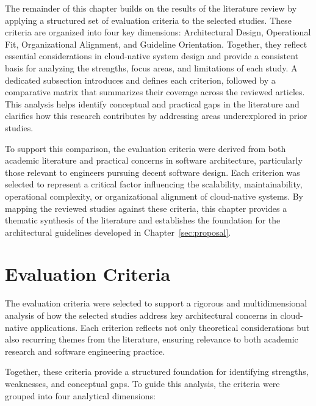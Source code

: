 The remainder of this chapter builds on the results of the literature review by applying a structured set of evaluation criteria to the selected studies. These criteria are organized into four key dimensions: Architectural Design, Operational Fit, Organizational Alignment, and Guideline Orientation. Together, they reflect essential considerations in cloud-native system design and provide a consistent basis for analyzing the strengths, focus areas, and limitations of each study. A dedicated subsection introduces and defines each criterion, followed by a comparative matrix that summarizes their coverage across the reviewed articles. This analysis helps identify conceptual and practical gaps in the literature and clarifies how this research contributes by addressing areas underexplored in prior studies.

To support this comparison, the evaluation criteria were derived from both academic literature and practical concerns in software architecture, particularly those relevant to engineers pursuing decent software design. Each criterion was selected to represent a critical factor influencing the scalability, maintainability, operational complexity, or organizational alignment of cloud-native systems. By mapping the reviewed studies against these criteria, this chapter provides a thematic synthesis of the literature and establishes the foundation for the architectural guidelines developed in Chapter~\ref{sec:proposal}.

\section{Evaluation Criteria}
\label{sec:evaluationcriteria}

The evaluation criteria were selected to support a rigorous and multidimensional analysis of how the selected studies address key architectural concerns in cloud-native applications. Each criterion reflects not only theoretical considerations but also recurring themes from the literature, ensuring relevance to both academic research and software engineering practice. 

Together, these criteria provide a structured foundation for identifying strengths, weaknesses, and conceptual gaps. To guide this analysis, the criteria were grouped into four analytical dimensions:

